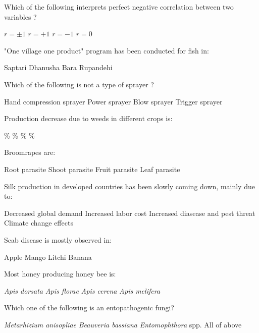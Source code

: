 \begin{questions}
\question Which of the following interprets perfect negative correlation between two variables ?
  \begin{choices}
  \choice $r = \pm 1$
  \choice $r = + 1$
  \choice $r = - 1$
  \choice $r = 0$
  \end{choices}

\question "One village one product" program has been conducted for fish in:
  \begin{choices}
  \choice Saptari
  \choice Dhanusha
  \choice Bara
  \choice Rupandehi
  \end{choices}

\question Which of the following is not a type of sprayer ?
  \begin{choices}
  \choice Hand compression sprayer
  \choice Power sprayer
  \choice Blow sprayer
  \choice Trigger sprayer
  \end{choices}

\question Production decrease due to weeds in different crops is:
  \begin{choices}
  \%
  \%
  \%
  \%
  \end{choices}

\question Broomrapes are:
  \begin{choices}
  \choice Root parasite
  \choice Shoot parasite
  \choice Fruit parasite
  \choice Leaf parasite
  \end{choices}

\question Silk production in developed countries has been slowly coming down, mainly due to:
  \begin{choices}
  \choice Decreased global demand
  \choice Increased labor cost
  \choice Increased diasease and pest threat
  \choice Climate change effects
  \end{choices}

\question Scab disease is mostly observed in:
  \begin{choices}
  \choice Apple
  \choice Mango
  \choice Litchi
  \choice Banana
  \end{choices}

\question Most honey producing honey bee is:
  \begin{choices}
  \choice \textit{Apis dorsata}
  \choice \textit{Apis florae}
  \choice \textit{Apis cerena}
  \choice \textit{Apis melifera}
  \end{choices}

\question Which one of the following is an entopathogenic fungi?
  \begin{choices}
  \choice \textit{Metarhizium anisopliae}
  \choice \textit{Beauveria bassiana}
  \choice \textit{Entomophthora} spp.
  \choice All of above
  \end{choices}


\end{questions}
